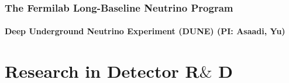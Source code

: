 \documentclass[11pt]{article}
\def\onehead#1{\part{#1}}
\def\twohead#1{\section{#1}}
\def\threehead#1{\subsection{#1}}
\begin{document}
\twohead{The Fermilab Long-Baseline Neutrino Program}



\threehead{Deep Underground Neutrino Experiment (DUNE) (PI: Asaadi, Yu)}




\newpage

\onehead{Research in Detector R$\&$ D}









%

\newpage




\end{document}
